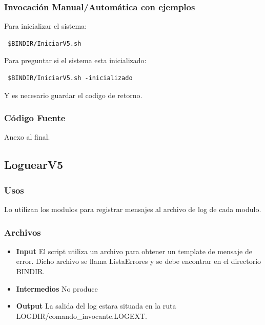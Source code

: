 \documentclass[a4paper,10pt,titlepage]{article}
\begin{document}
		\subsubsection{Invocaci\'on Manual/Autom\'atica con ejemplos}

Para inicializar el sistema:

\begin{verbatim}
 $BINDIR/IniciarV5.sh 
\end{verbatim}

Para preguntar si el sistema esta inicializado:

\begin{verbatim}
 $BINDIR/IniciarV5.sh -inicializado
\end{verbatim}

Y es necesario guardar el codigo de retorno.


		\subsubsection{C\'odigo Fuente}
			Anexo al final.

	\subsection{LoguearV5}
		\subsubsection{Usos}

Lo utilizan los modulos para registrar mensajes al archivo de log de cada modulo.

		\subsubsection{Archivos}
			\begin {itemize}
				\item \textbf{Input} {El script utiliza un archivo para obtener un template de mensaje de error. Dicho archivo se llama ListaErrores y se debe encontrar en el directorio BINDIR.}
				\item \textbf{Intermedios} {No produce}
				\item \textbf{Output} {La salida del log estara situada en la ruta LOGDIR/comando\_invocante.LOGEXT.}
			\end{itemize}
\end{document}
